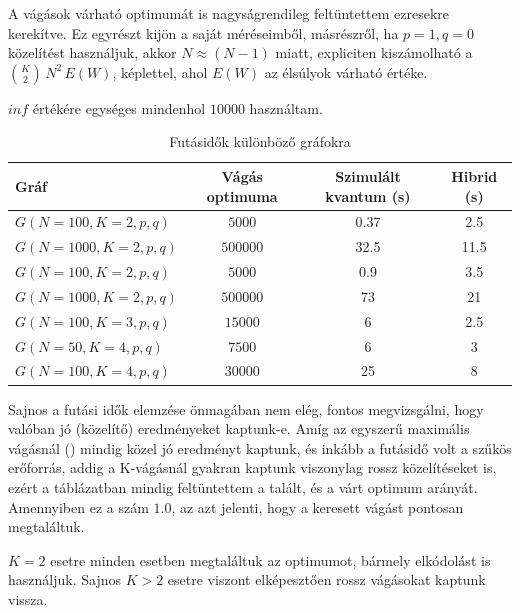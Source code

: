 A vágások várható optimumát is nagyságrendileg feltüntettem ezresekre kerekítve. Ez egyrészt kijön a saját méréseimből, másrészről, ha $p=1, q=0$ közelítést használjuk, akkor $N \approx (N-1)$ miatt, expliciten kiszámolható a $\binom{K}{2} \, N^2 \, E(W)$, képlettel, ahol $E(W)$ az élsúlyok várható értéke.

$inf$ értékére egységes mindenhol $10000$ használtam.

\begin{table}[ht]
	\footnotesize
	\centering
	\begin{tabular}{ l c c c }
		\toprule
		Gráf & Vágás optimuma & Szimulált kvantum (s) & Hibrid (s) \\
		\midrule
		$G(N=100, K=2, p, q)$ & $5000$ & 0.37 & 2.5   \\
		$G(N=1000, K=2, p, q)$ & $500000$ & 32.5 & 11.5 \\
		$G(N=100, K=2, p, q)$ & $5000$ & 0.9 & 3.5  \\
		$G(N=1000, K=2, p, q)$ & $500000$ & 73 & 21 \\	
		$G(N=100, K=3, p, q)$ & $15000$ & 6 & 2.5 \\		
		$G(N=50, K=4, p, q)$ & $7500$ & 6 & 3 \\		
		$G(N=100, K=4, p, q)$ & $30000$ & 25 & 8 \\

		\bottomrule
	\end{tabular}
	\caption{Futásidők különböző gráfokra}
	\label{tab:TabularExample}
\end{table}

Sajnos a futási idők elemzése önmagában nem elég, fontos megvizsgálni, hogy valóban jó (közelítő) eredményeket kaptunk-e. Amíg az egyszerű maximális vágásnál () mindig közel jó eredményt kaptunk, és inkább a futásidő volt a szűkös erőforrás, addig a K-vágásnál gyakran kaptunk viszonylag rossz közelítéseket is, ezért a táblázatban mindig feltüntettem a talált, és a várt optimum arányát. Amennyiben ez a szám $1.0$, az azt jelenti, hogy a keresett vágást pontosan megtaláltuk. 

$K=2$ esetre minden esetben megtaláltuk az optimumot, bármely elkódolást is használjuk.
Sajnos $K>2$ esetre viszont elképesztően rossz vágásokat kaptunk vissza.


